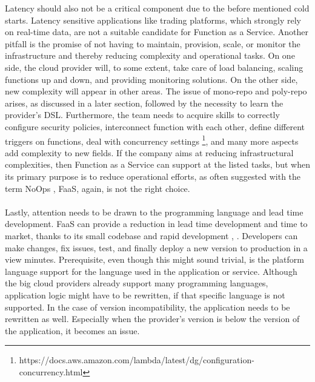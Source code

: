 \documentclass[11pt]{article}
\begin{document}
Latency should also not be a critical component due to the before mentioned cold starts. Latency sensitive applications like trading platforms, which strongly rely on real-time data, are not a suitable candidate for Function as a Service. Another pitfall is the promise of not having to maintain, provision, scale, or monitor the infrastructure and thereby reducing complexity and operational tasks. On one side, the cloud provider will, to some extent, take care of load balancing, scaling functions up and down, and providing monitoring solutions. On the other side, new complexity will appear in other areas. The issue of mono-repo and poly-repo arises, as discussed in a later section, followed by the necessity to learn the provider's DSL. Furthermore, the team needs to acquire skills to correctly configure security policies, interconnect function with each other, define different triggers on functions, deal with concurrency settings \footnote{https://docs.aws.amazon.com/lambda/latest/dg/configuration-concurrency.html}, and many more aspects add complexity to new fields. If the company aims at reducing infrastructural complexities, then Function as a Service can support at the listed tasks, but when its primary purpose is to reduce operational efforts, as often suggested with the term \glqq NoOps\grqq{} \cite{eivy2017wary}, FaaS, again, is not the right choice. \\\\
Lastly, attention needs to be drawn to the programming language and lead time development. FaaS can provide a reduction in lead time development and time to market, thanks to its small codebase and rapid development \cite{sewak2018winning}, \cite{leitner2019mixed}. Developers can make changes, fix issues, test, and finally deploy a new version to production in a view minutes. Prerequisite, even though this might sound trivial, is the platform language support for the language used in the application or service. Although the big cloud providers already support many programming languages, application logic might have to be rewritten, if that specific language is not supported. In the case of version incompatibility, the application needs to be rewritten as well. Especially when the provider's version is below the version of the application, it becomes an issue.
\end{document}
